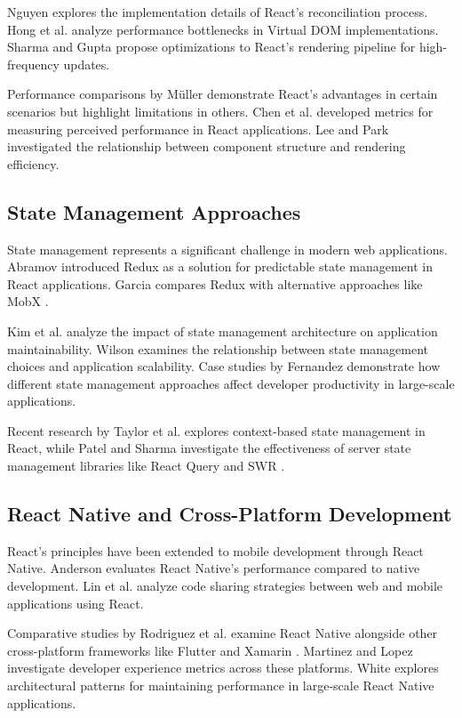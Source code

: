 Nguyen \cite{nguyen2018} explores the implementation details of React's reconciliation process. Hong et al. \cite{hong2019} analyze performance bottlenecks in Virtual DOM implementations. Sharma and Gupta \cite{sharma2021} propose optimizations to React's rendering pipeline for high-frequency updates.

Performance comparisons by Müller \cite{muller2020} demonstrate React's advantages in certain scenarios but highlight limitations in others. Chen et al. \cite{chen2022} developed metrics for measuring perceived performance in React applications. Lee and Park \cite{lee2021} investigated the relationship between component structure and rendering efficiency.

\subsection{State Management Approaches}
State management represents a significant challenge in modern web applications. Abramov \cite{abramov2015} introduced Redux as a solution for predictable state management in React applications. Garcia \cite{garcia2018} compares Redux with alternative approaches like MobX \cite{mobx2016}.

Kim et al. \cite{kim2020} analyze the impact of state management architecture on application maintainability. Wilson \cite{wilson2019} examines the relationship between state management choices and application scalability. Case studies by Fernandez \cite{fernandez2021} demonstrate how different state management approaches affect developer productivity in large-scale applications.

Recent research by Taylor et al. \cite{taylor2022} explores context-based state management in React, while Patel and Sharma \cite{patel2021} investigate the effectiveness of server state management libraries like React Query \cite{reactquery2019} and SWR \cite{swr2020}.

\subsection{React Native and Cross-Platform Development}
React's principles have been extended to mobile development through React Native. Anderson \cite{anderson2018} evaluates React Native's performance compared to native development. Lin et al. \cite{lin2020} analyze code sharing strategies between web and mobile applications using React.

Comparative studies by Rodriguez et al. \cite{rodriguez2021} examine React Native alongside other cross-platform frameworks like Flutter \cite{flutter2018} and Xamarin \cite{xamarin2011}. Martinez and Lopez \cite{martinez2019} investigate developer experience metrics across these platforms. White \cite{white2022} explores architectural patterns for maintaining performance in large-scale React Native applications.

